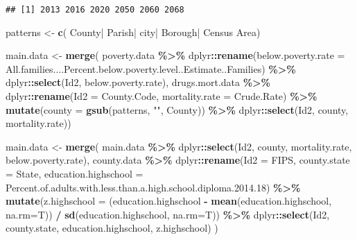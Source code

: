 \documentclass[
]{article}
\newenvironment{Shaded}{\begin{snugshade}}{\end{snugshade}}
\newcommand{\AttributeTok}[1]{\textcolor[rgb]{0.13,0.29,0.53}{#1}}
\newcommand{\FloatTok}[1]{\textcolor[rgb]{0.00,0.00,0.81}{#1}}
\newcommand{\FunctionTok}[1]{\textcolor[rgb]{0.13,0.29,0.53}{\textbf{#1}}}
\newcommand{\NormalTok}[1]{#1}
\newcommand{\OtherTok}[1]{\textcolor[rgb]{0.56,0.35,0.01}{#1}}
\newcommand{\SpecialCharTok}[1]{\textcolor[rgb]{0.81,0.36,0.00}{\textbf{#1}}}
\newcommand{\StringTok}[1]{\textcolor[rgb]{0.31,0.60,0.02}{#1}}
\begin{document}
\begin{verbatim}
## [1] 2013 2016 2020 2050 2060 2068
\end{verbatim}

\vspace{6mm}

\begin{Shaded}
\begin{Highlighting}[]
\NormalTok{patterns }\OtherTok{\textless{}{-}} \FunctionTok{c}\NormalTok{(}\StringTok{\textquotesingle{} County| Parish| city| Borough| Census Area\textquotesingle{}}\NormalTok{)}

\NormalTok{main.data }\OtherTok{\textless{}{-}} \FunctionTok{merge}\NormalTok{(}
\NormalTok{  poverty.data }\SpecialCharTok{\%\textgreater{}\%} 
\NormalTok{    dplyr}\SpecialCharTok{::}\FunctionTok{rename}\NormalTok{(}\AttributeTok{below.poverty.rate =} 
\NormalTok{             All.families....Percent.below.poverty.level..Estimate..Families)  }\SpecialCharTok{\%\textgreater{}\%} 
\NormalTok{    dplyr}\SpecialCharTok{::}\FunctionTok{select}\NormalTok{(Id2, below.poverty.rate),}
\NormalTok{  drugs.mort.data }\SpecialCharTok{\%\textgreater{}\%} 
\NormalTok{    dplyr}\SpecialCharTok{::}\FunctionTok{rename}\NormalTok{(}\AttributeTok{Id2 =}\NormalTok{ County.Code,}
                \AttributeTok{mortality.rate =}\NormalTok{ Crude.Rate) }\SpecialCharTok{\%\textgreater{}\%} 
    \FunctionTok{mutate}\NormalTok{(}\AttributeTok{county =} \FunctionTok{gsub}\NormalTok{(patterns, }\StringTok{""}\NormalTok{, County))  }\SpecialCharTok{\%\textgreater{}\%}
\NormalTok{    dplyr}\SpecialCharTok{::}\FunctionTok{select}\NormalTok{(Id2, county, mortality.rate))}
\end{Highlighting}
\end{Shaded}

\begin{Shaded}
\begin{Highlighting}[]
\NormalTok{main.data }\OtherTok{\textless{}{-}} \FunctionTok{merge}\NormalTok{(}
\NormalTok{  main.data }\SpecialCharTok{\%\textgreater{}\%}
\NormalTok{    dplyr}\SpecialCharTok{::}\FunctionTok{select}\NormalTok{(Id2, county, mortality.rate, below.poverty.rate),}
\NormalTok{  county.data }\SpecialCharTok{\%\textgreater{}\%}
\NormalTok{    dplyr}\SpecialCharTok{::}\FunctionTok{rename}\NormalTok{(}\AttributeTok{Id2 =}\NormalTok{ FIPS,}
                 \AttributeTok{county.state =}\NormalTok{ State,}
                 \AttributeTok{education.highschool =}\NormalTok{ Percent.of.adults.with.less.than.a.high.school.diploma.}\FloatTok{2014.18}\NormalTok{) }\SpecialCharTok{\%\textgreater{}\%}
    \FunctionTok{mutate}\NormalTok{(}\AttributeTok{z.highschool =}\NormalTok{ (education.highschool }\SpecialCharTok{{-}} \FunctionTok{mean}\NormalTok{(education.highschool, }\AttributeTok{na.rm=}\NormalTok{T)) }\SpecialCharTok{/}
           \FunctionTok{sd}\NormalTok{(education.highschool, }\AttributeTok{na.rm=}\NormalTok{T)) }\SpecialCharTok{\%\textgreater{}\%}
\NormalTok{    dplyr}\SpecialCharTok{::}\FunctionTok{select}\NormalTok{(Id2, county.state, education.highschool, z.highschool)}
\NormalTok{)}
\end{Highlighting}
\end{Shaded}
\end{document}
